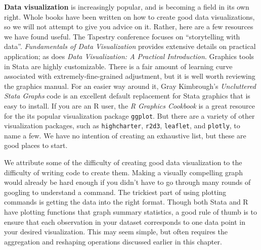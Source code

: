 \textbf{Data visualization} 
is increasingly popular, 
and is becoming a field in its own right.\cite{healy2018data,wilke2019fundamentals}
Whole books have been written on how to create good data visualizations,
so we will not attempt to give you advice on it.
Rather, here are a few resources we have found useful.
The Tapestry conference focuses on ``storytelling with data''.
\textit{Fundamentals of Data Visualization} provides extensive details on practical application;
as does \textit{Data Visualization: A Practical Introduction}.
Graphics tools in Stata are highly customizable.
There is a fair amount of learning curve associated with extremely-fine-grained adjustment,
but it is well worth reviewing the graphics manual.
For an easier way around it, Gray Kimbrough's 
\textit{Uncluttered Stata Graphs}
code is an excellent default replacement for Stata graphics that is easy to install.
If you are an R user, the \textit{R Graphics Cookbook}
is a great resource for the its popular visualization package \texttt{ggplot}.
But there are a variety of other visualization packages,
such as \texttt{highcharter},
\texttt{r2d3},
\texttt{leaflet},
and \texttt{plotly}, to name a few.
We have no intention of creating an exhaustive list, 
but these are good places to start.

We attribute some of the difficulty of creating good data visualization
to the difficulty of writing code to create them.
Making a visually compelling graph would already be hard enough if
you didn't have to go through many rounds of googling to understand a command.
The trickiest part of using plotting commands is getting the data into the right format.
Though both Stata and R have plotting functions that graph summary statistics,
a good rule of thumb is to ensure that each
observation in your dataset corresponds to one data point in your desired visualization.
This may seem simple, 
but often requires the aggregation and reshaping operations
discussed earlier in this chapter.

